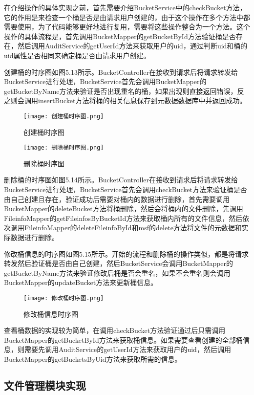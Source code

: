 在介绍操作的具体实现之前，首先需要介绍BucketService中的checkBucket方法，它的作用是来检查一个桶是否是由请求用户创建的，由于这个操作在多个方法中都需要使用，为了代码能够更好地进行复用，需要将这些操作整合为一个方法。这个操作的具体流程是，首先调用BucketMapper的getBucketById方法验证桶是否存在，然后调用AuditService的getUserId方法来获取用户的uid，通过判断uid和桶的uid属性是否相同来确定桶是否由请求用户创建。

创建桶的时序图如图5.13所示。BucketController在接收到请求后将请求转发给BucketService进行处理，BucketService首先会调用BucketMapper的getBucketByName方法来验证是否出现重名的桶，如果出现则直接返回错误，反之则会调用insertBucket方法将桶的相关信息保存到元数据数据库中并返回成功。

\begin{figure}
  \centering
  \texttt{[image: 创建桶时序图.png]}
  \caption{创建桶时序图}
\end{figure}


\begin{figure}
  \centering
  \texttt{[image: 删除桶时序图.png]}
  \caption{删除桶时序图}
\end{figure}

删除桶的时序图如图5.14所示。BucketController在接收到请求后将请求转发给BucketService进行处理，BucketService首先会调用checkBucket方法来验证桶是否由自己创建且存在，验证成功后需要对桶内的数据进行删除，首先需要调用BucketMapper的deleteBucket方法将桶删除，然后会将桶内的文件删除，先调用FileinfoMapper的getFileinfosByBucketId方法来获取桶内所有的文件信息，然后依次调用FileinfoMapper的deleteFileinfoById和msf的delete方法将文件的元数据和实际数据进行删除。

修改桶信息的时序图如图5.15所示。开始的流程和删除桶的操作类似，都是将请求转发然后验证桶是否由自己创建，然后BucketService会调用BucketMapper的getBucketByName方法来验证修改后桶是否会重名，如果不会重名则会调用BucketMapper的updateBucket方法来更新桶信息。

\begin{figure}
  \centering
  \texttt{[image: 修改桶时序图.png]}
  \caption{修改桶信息时序图}
\end{figure}

查看桶数据的实现较为简单，在调用checkBucket方法验证通过后只需调用BucketMapper的getBucketById方法来获取桶信息。如果需要查看创建的全部桶信息，则需要先调用AuditService的getUserId方法来获取用户的uid，然后调用BucketMapper的getBucketsByUid方法来获取所需的信息。

\subsection{文件管理模块实现}

